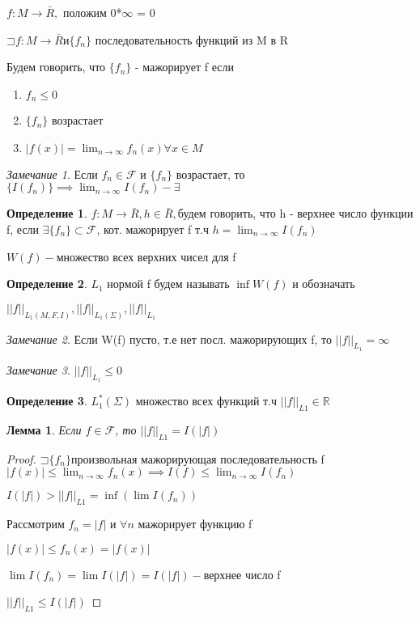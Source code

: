 \documentclass[a4paper, 12pt]{article}
\newcommand\letsymbol{\mathord{\sqsupset}}
\newtheorem{lemma}{Лемма}[section]
\theoremstyle{definition}
\newtheorem*{definition}{Определение}
\theoremstyle{remark}
\newtheorem*{remark}{Замечание}
\begin{document}
$f:M\to\bar{R},$ положим 0*$\infty$ = 0

$\letsymbol{}f : M \to \bar{R} и \{f_n\}$ последовательность функций из M в R

Будем говорить, что $\{f_n\}$ - мажорирует f если 

\begin{enumerate}
     \item $f_n\leq 0$
     \item $\{f_n\}$ возрастает
     \item $|f(x)| = \lim_{n\to\infty}f_n(x)\forall x\in M$ 
\end{enumerate}
\begin{remark}
     Если $f_n\in \mathcal{F} $ и $\{f_n\}$ возрастает, то $\{I(f_n)\}\implies \lim_{n\to\infty}I(f_n)-\exists$
\end{remark}
\begin{definition}
     $f:M\to\bar{R}, h\in\bar{R},$будем говорить, что h - верхнее число
     функции f, если $\exists\{f_n\}\subset \mathcal{F} $, кот. мажорирует
     f т.ч $h = \lim_{n\to\infty}I(f_n)$

     $W(f) - $множество всех верхних чисел для f
\end{definition}
\begin{definition}
     $L_1$ нормой f будем называть $\inf W(f)$ и обозначать

     $||f||_{L_1(M, F, I)}, ||f||_{L_1(\Sigma)}, ||f||_{L_1}$
\end{definition}
\begin{remark}
     Если W(f) пусто, т.е нет посл. мажорирующих f, то $||f||_{L_1} = \infty$
\end{remark}
\begin{remark}
     $||f||_{L_1}\leq 0$
\end{remark}
\begin{definition}
     $L_1^*(\Sigma)$ множество всех функций т.ч $||f||_{L1}\in \mathbb{R} $
\end{definition}
\begin{lemma}
     Если $f\in\mathcal{F} $, то $||f||_{L1} = I(|f|)$
\end{lemma}
\begin{proof}
     $\letsymbol{}\{f_n\} $произвольная мажорирующая последовательность f
     $|f(x)|\leq \lim_{n\to\infty}f_n(x)\implies I(f)\leq \lim_{n\to\infty}I(f_n)$

     $I(|f|)>||f||_{L1} = \inf (\lim I(f_n))$

     Рассмотрим $f_n = |f|$ и $\forall n$ мажорирует функцию f

     $|f(x)|\leq f_n(x) = |f(x)|$

     $\lim I(f_n) = \lim I(|f|) = I(|f|) - $верхнее число f

     $||f||_{L1}\leq I(|f|)$
\end{proof}
\end{document}
